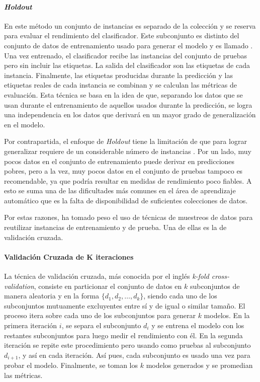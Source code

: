 \paragraph{\textit{Holdout}} 

En este método un conjunto de instancias es separado de la colección y se
reserva para evaluar el rendimiento del clasificador.  Este subconjunto es
distinto del conjunto de datos de entrenamiento usado para generar el modelo y
es llamado . Una vez entrenado,
el clasificador recibe las instancias del conjunto de pruebas pero sin incluir
las etiquetas. La salida del clasificador son las etiquetas de cada instancia.
Finalmente, las etiquetas producidas durante la predicción y las etiquetas
reales de cada instancia se combinan y se calculan las métricas de evaluación.
Esta técnica se basa en la idea de que, separando los datos que se usan durante
el entrenamiento de aquellos usados durante la predicción, se logra una
independencia en los datos que derivará en un mayor grado de generalización en
el modelo. 

Por contrapartida, el enfoque de \textit{Holdout} tiene la limitación de que
para lograr generalizar requiere de un considerable número de instancias
. Por un lado, muy pocos datos en el conjunto de
entrenamiento puede derivar en predicciones pobres, pero a la vez, muy pocos
datos en el conjunto de pruebas tampoco es recomendable, ya que podría resultar
en medidas de rendimiento poco fiables. A esto se suma una de las dificultades
más comunes en el área de aprendizaje automático que es la falta de
disponibilidad de suficientes colecciones de datos. 

Por estas razones, ha tomado peso el uso de técnicas de muestreos de datos para
reutilizar instancias de entrenamiento y de prueba. Una de ellas es la de
validación cruzada.

\paragraph{Validación Cruzada de K iteraciones} 

La técnica de validación cruzada, más conocida por el inglés \textit{k-fold
cross-validation}, consiste en particionar el conjunto de datos en $k$
subconjuntos de manera aleatoria y en la forma $\{d_{1}, d_{2},  \dots, d_{k}
\}$, siendo cada uno de los subconjuntos mutuamente excluyentes entre sí y de
igual o similar tamaño. El proceso itera sobre cada uno de los subconjuntos para
generar $k$ modelos. En la primera iteración $i$, se separa el subconjunto
$d_{i}$ y se entrena el modelo con los restantes subconjuntos para luego medir
el rendimiento con él. En la segunda iteración se repite este procedimiento pero
usando como pruebas al subconjunto $d_{i+1}$, y así en cada iteración. Así pues,
cada subconjunto es usado una vez para probar el modelo. Finalmente, se toman
los $k$ modelos generados y se promedian las métricas. 

